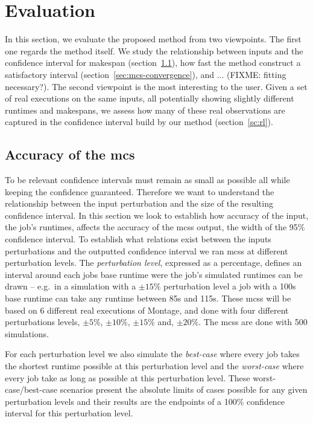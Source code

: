\documentclass[10pt,conference,compsocconf]{IEEEtran}
\newcommand{\pmpc}[1]{$\pm#1\%$}
\begin{document}
\section{Evaluation}

In this section, we evaluate the  proposed method from two viewpoints. The first
one regards the method itself. We  study the relationship between inputs and the
confidence interval for makespan (section~\ref{sec:mcs-accuracy}), how fast the
method construct a satisfactory interval (section~\ref{sec:mcs-convergence}), and
... (FIXME: fitting necessary?). The second viewpoint is the most interesting to
the user.  Given a set  of real executions on  the same inputs,  all potentially
showing slightly different  runtimes and makespans, we assess how  many of these
real observations  are captured in the  confidence interval build by  our method
(section~\ref{sc:rl}).
  


\subsection{Accuracy of the \acl{mcs}}
\label{sec:mcs-accuracy}

To be relevant  confidence intervals must remain as small  as possible all while
keeping  the  confidence  guaranteed.  Therefore   we  want  to  understand  the
relationship  between the  input  perturbation  and the  size  of the  resulting
confidence interval.  In this section we  look to establish how accuracy of the
input, the  job's runtimes, affects the accuracy of the \acp{mcs}  output, the
width  of the  95\%  confidence  interval.  To  establish  what relations  exist
between the  inputs perturbations and  the outputted confidence interval  we ran
\acp{mcs}  at different  perturbation  levels.   The \emph{perturbation  level},
expressed as  a percentage, defines  an interval  around each jobs  base runtime
were the job's  simulated runtimes can be  drawn -- e.g.~in a  simulation with a
\pmpc{15} perturbation level a job with a 100s base runtime can take any runtime
between  85s  and 115s.  These  \acp{mcs}  will be  based  on  6 different  real
executions  of  Montage, and  done  with  four different  perturbations  levels,
\pmpc{5}, \pmpc{10}, \pmpc{15} and, \pmpc{20}.   The \acp{mcs} are done with 500
simulations.

For each perturbation level we also simulate the \emph{best-case} where every
job takes the shortest runtime possible at this perturbation level and the
\emph{worst-case} where every job take as long as possible at this perturbation
level. These worst-case/best-case scenarios present the absolute limits of cases
possible for any given perturbation levels and their results are the endpoints
of a 100\% confidence interval for this perturbation level.
\end{document}
